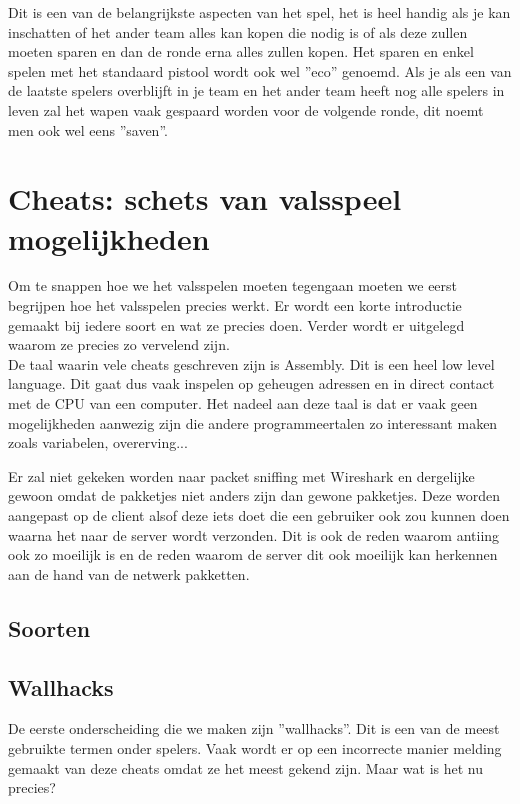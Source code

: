 \documentclass[pdftex,a4paper,12pt,twoside]{report}
\begin{document}
Dit is een van de belangrijkste aspecten van het spel, het is heel handig als je kan inschatten of het ander team alles kan kopen die nodig is of als deze zullen moeten sparen en dan de ronde erna alles zullen kopen. Het sparen en enkel spelen met het standaard pistool wordt ook wel ''eco'' genoemd. Als je als een van de laatste spelers overblijft in je team en het ander team heeft nog alle spelers in leven zal het wapen vaak gespaard worden voor de volgende ronde, dit noemt men ook wel eens ''saven''.


\chapter{Cheats: schets van valsspeel mogelijkheden}
\label{ch:cheats}

Om te snappen hoe we het valsspelen moeten tegengaan moeten we eerst begrijpen hoe het valsspelen precies werkt. Er wordt een korte introductie gemaakt bij iedere soort en wat ze precies doen. Verder wordt er uitgelegd waarom ze precies zo vervelend zijn.
\\

De taal waarin vele \gls{cheat}s geschreven zijn is Assembly. Dit is een heel low level language. Dit gaat dus vaak inspelen op geheugen adressen en in direct contact met de CPU van een computer. Het nadeel aan deze taal is dat er vaak geen mogelijkheden aanwezig zijn die andere programmeertalen zo interessant maken zoals variabelen, overerving...
\citep{assembly}

Er zal niet gekeken worden naar packet sniffing met Wireshark en dergelijke gewoon omdat de pakketjes niet anders zijn dan gewone pakketjes. Deze worden aangepast op de client alsof deze iets doet die een gebruiker ook zou kunnen doen waarna het naar de server wordt verzonden. Dit is ook de reden waarom \gls{anti}ing ook zo moeilijk is en de reden waarom de server dit ook moeilijk kan herkennen aan de hand van de netwerk pakketten.

\section{Soorten}
\label{sec:soorten}
\section{Wallhacks}
\label{sec:walls}
De eerste onderscheiding die we maken zijn ''wallhacks''. Dit is een van de meest gebruikte termen onder spelers. Vaak wordt er op een incorrecte manier melding gemaakt van deze \gls{cheat}s omdat ze het meest gekend zijn. Maar wat is het nu precies?
\\
\end{document}
